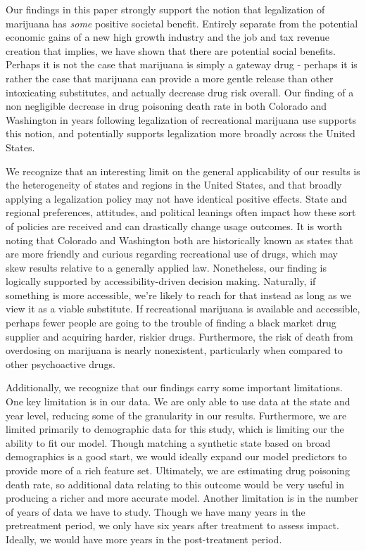 \documentclass{article}
\begin{document}
Our findings in this paper strongly support the notion that legalization of marijuana has \emph{some} positive societal benefit. Entirely separate from the potential economic gains of a new high growth industry and the job and tax revenue creation that implies, we have shown that there are potential social benefits. Perhaps it is not the case that marijuana is simply a gateway drug - perhaps it is rather the case that marijuana can provide a more gentle release than other intoxicating substitutes, and actually decrease drug risk overall. Our finding of a non negligible decrease in drug poisoning death rate in both Colorado and Washington in years following legalization of recreational marijuana use supports this notion, and potentially supports legalization more broadly across the United States.

We recognize that an interesting limit on the general applicability of our results is the heterogeneity of states and regions in the United States, and that broadly applying a legalization policy may not have identical positive effects. State and regional preferences, attitudes, and political leanings often impact how these sort of policies are received and can drastically change usage outcomes. It is worth noting that Colorado and Washington both are historically known as states that are more friendly and curious regarding recreational use of drugs, which may skew results relative to a generally applied law. Nonetheless, our finding is logically supported by accessibility-driven decision making. Naturally, if something is more accessible, we're likely to reach for that instead as long as we view it as a viable substitute. If recreational marijuana is available and accessible, perhaps fewer people are going to the trouble of finding a black market drug supplier and acquiring harder, riskier drugs. Furthermore, the risk of death from overdosing on marijuana is nearly nonexistent, particularly when compared to other psychoactive drugs.

Additionally, we recognize that our findings carry some important limitations. One key limitation is in our data. We are only able to use data at the state and year level, reducing some of the granularity in our results. Furthermore, we are limited primarily to demographic data for this study, which  is limiting our the ability to fit our model. Though matching a synthetic state based on broad demographics is a good start, we would ideally expand our model predictors to provide more of a rich feature set. Ultimately, we are estimating drug poisoning death rate, so additional data relating to this outcome would be very useful in producing a richer and more accurate model. Another limitation is in the number of years of data we have to study. Though we have many years in the pretreatment period, we only have six years after treatment to assess impact. Ideally, we would have more years in the post-treatment period.
\end{document}
